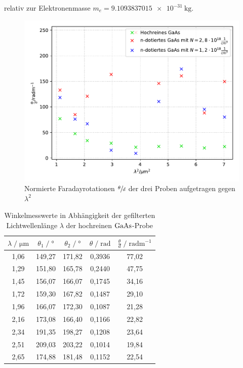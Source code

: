 relativ zur Elektronenmasse $m_e = \SI{9.1093837015e-31}{\kilo\gram}$.


\begin{figure}[H]
    \centering
    \includegraphics[scale=0.7]{content/plot2.pdf}
    \caption{Normierte Faradayrotationen $\sfrac{\theta}{d}$ der drei Proben aufgetragen gegen $\lambda^2$}
    \label{fig:plot2}
\end{figure}

\begin{table}
    \centering
    \caption{Winkelmesswerte in Abhängigkeit der gefilterten Lichtwellenlänge $\lambda$ 
        der hochreinen $\ce{GaAs}$-Probe}
    \label{tab:mess2}
    \begin{tabular}{c c c c c}
    \toprule
    $\lambda \;/\; \si{\micro\meter}$ & $\theta_1 \;/\; \si{\degree}$ &  $\theta_2 \;/\; \si{\degree}$ & 
    $\theta \;/\; \si{\radian}$ &  $\frac{\theta}{d} \;/\; \si{\radian\meter\tothe{-1}}$\\
    \midrule
        1,06 & 149,27 & 171,82 & 0,3936 & 77,02 \\
        1,29 & 151,80 & 165,78 & 0,2440 & 47,75 \\
        1,45 & 156,07 & 166,07 & 0,1745 & 34,16 \\
        1,72 & 159,30 & 167,82 & 0,1487 & 29,10 \\
        1,96 & 166,07 & 172,30 & 0,1087 & 21,28 \\
        2,16 & 173,08 & 166,40 & 0,1166 & 22,82 \\
        2,34 & 191,35 & 198,27 & 0,1208 & 23,64 \\
        2,51 & 209,03 & 203,22 & 0,1014 & 19,84 \\
        2,65 & 174,88 & 181,48 & 0,1152 & 22,54 \\
    \bottomrule
    \end{tabular}
\end{table}

